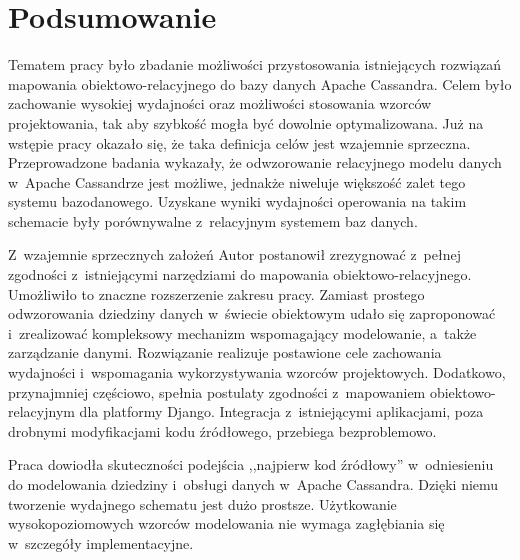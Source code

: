 
\chapter{Podsumowanie}

Tematem pracy było zbadanie możliwości przystosowania istniejących rozwiązań mapowania obiektowo-relacyjnego do bazy danych Apache Cassandra. Celem było zachowanie wysokiej wydajności oraz możliwości stosowania wzorców projektowania, tak aby szybkość mogła być dowolnie optymalizowana. Już na wstępie pracy okazało się, że taka definicja celów jest wzajemnie sprzeczna. Przeprowadzone badania wykazały, że odwzorowanie relacyjnego modelu danych w~Apache Cassandrze jest możliwe, jednakże niweluje większość zalet tego systemu bazodanowego. Uzyskane wyniki wydajności operowania na takim schemacie były porównywalne z~relacyjnym systemem baz danych.

Z~wzajemnie sprzecznych założeń Autor postanowił zrezygnować z~pełnej zgodności z~istniejącymi narzędziami do mapowania obiektowo-relacyjnego. Umożliwiło to znaczne rozszerzenie zakresu pracy. Zamiast prostego odwzorowania dziedziny danych w~świecie obiektowym udało się zaproponować i~zrealizować kompleksowy mechanizm wspomagający modelowanie, a~także zarządzanie danymi. Rozwiązanie realizuje postawione cele zachowania wydajności i~wspomagania wykorzystywania wzorców projektowych. Dodatkowo, przynajmniej częściowo, spełnia postulaty zgodności z~mapowaniem obiektowo-relacyjnym dla platformy Django. Integracja z~istniejącymi aplikacjami, poza drobnymi modyfikacjami kodu źródłowego, przebiega bezproblemowo.

Praca dowiodła skuteczności podejścia ,,najpierw kod źródłowy'' w~odniesieniu do modelowania dziedziny i~obsługi danych w~Apache Cassandra. Dzięki niemu tworzenie wydajnego schematu jest dużo prostsze. Użytkowanie wysokopoziomowych wzorców modelowania nie wymaga zagłębiania się w~szczegóły implementacyjne. 

